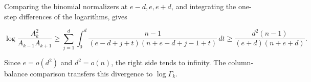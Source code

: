Comparing the binomial normalizers at $e-d,e,e+d$, and integrating the one-step differences of the logarithms, gives

\begin{equation*}
\log\frac{A_k^2}{A_{k-1}A_{k+1}}
\ge\sum_{j=1}^d\int_0^d\frac{n-1}{(e-d+j+t)(n+e-d+j-1+t)}\,dt
\ge\frac{d^2(n-1)}{(e+d)(n+e+d)}.
\end{equation*}

Since $e=o(d^2)$ and $d^2=o(n)$, the right side tends to infinity. The column-balance comparison transfers this divergence to $\log\Gamma_k$.
